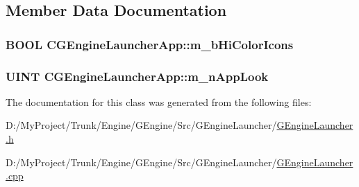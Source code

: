 \subsection{Member Data Documentation}
\hypertarget{class_c_g_engine_launcher_app_a2a79c5e1afe718ed57bc8a550addbf12}{}
\subsubsection[{m\+\_\+b\+Hi\+Color\+Icons}]{\setlength{\rightskip}{0pt plus 5cm}B\+O\+O\+L C\+G\+Engine\+Launcher\+App\+::m\+\_\+b\+Hi\+Color\+Icons}\label{class_c_g_engine_launcher_app_a2a79c5e1afe718ed57bc8a550addbf12}
\hypertarget{class_c_g_engine_launcher_app_adcf0224f8eeb538e22cc34c3270ed9a5}{}
\subsubsection[{m\+\_\+n\+App\+Look}]{\setlength{\rightskip}{0pt plus 5cm}U\+I\+N\+T C\+G\+Engine\+Launcher\+App\+::m\+\_\+n\+App\+Look}\label{class_c_g_engine_launcher_app_adcf0224f8eeb538e22cc34c3270ed9a5}


The documentation for this class was generated from the following files\+:\begin{DoxyCompactItemize}
\item 
D\+:/\+My\+Project/\+Trunk/\+Engine/\+G\+Engine/\+Src/\+G\+Engine\+Launcher/\hyperlink{_g_engine_launcher_8h}{G\+Engine\+Launcher.\+h}\item 
D\+:/\+My\+Project/\+Trunk/\+Engine/\+G\+Engine/\+Src/\+G\+Engine\+Launcher/\hyperlink{_g_engine_launcher_8cpp}{G\+Engine\+Launcher.\+cpp}\end{DoxyCompactItemize}
